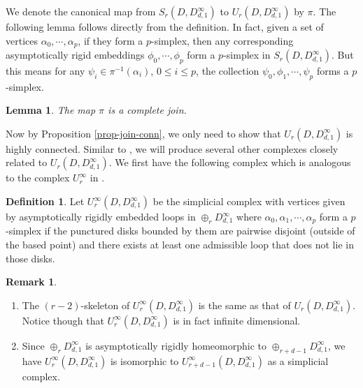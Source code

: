 \documentclass[11pt, a4paper]{amsart}
\newtheorem{lem}[thm]{Lemma}
\theoremstyle{definition}
\newtheorem{rem}[thm]{Remark}
\newtheorem{defn}[thm]{Definition} %
\begin{document}
  

We denote the canonical map from $S_r(D,D^{\infty}_{d,1})$ to $U_r(D,D^{\infty}_{d,1})$ by $\pi$. The following lemma follows directly from the definition. In fact, given a set of vertices $\alpha_0,\cdots, \alpha_p$, if they form a $p$-simplex, then  any corresponding asymptotically rigid embeddings $\phi_0,\cdots,\phi_p$  form a $p$-simplex in $S_r(D,D^{\infty}_{d,1})$. But this means for any $\psi_i \in \pi^{-1}(\alpha_i)$, $0\leq i\leq p$, the collection $\psi_0, \phi_1,\cdots, \psi_p$ forms a $p$-simplex.


\begin{lem}\label{lem-cpt-jn}
The map $\pi$ is a complete join.
\end{lem}




Now by Proposition \ref{prop-join-conn}, we only need to show that $U_r(D,D^{\infty}_{d,1})$ is highly connected.  Similar to \cite[Section 2.4]{SW19}, we will produce several other complexes closely related to $U_r(D,D^{\infty}_{d,1})$. We first have the following complex which is analogous to the complex $U_r^{\infty}$ in \cite[Definition 2.12]{SW19}.
 
\begin{defn}
  Let $U_r^{\infty}(D,D^{\infty}_{d,1})$ be the simplicial complex with vertices given by asymptotically rigidly embedded loops in  $\oplus_r D^{\infty}_{d,1}$ where $\alpha_0,\alpha_1,\cdots,\alpha_p$ form a $p$-simplex if the punctured disks bounded by them are pairwise disjoint (outside of the based point) and there exists  at least one admissible loop that does not lie in those disks.
\end{defn}

\begin{rem} \label{rem-Un}
\begin{enumerate}
    \item The $(r-2)$-skeleton of $U_r^{\infty}(D,D^{\infty}_{d,1})$ is the same as that of $U_r(D,D^{\infty}_{d,1})$. Notice though that $U_r^{\infty}(D,D^{\infty}_{d,1})$ is in fact infinite dimensional.
    
    \item Since $\oplus_rD^{\infty}_{d,1}$ is asymptotically rigidly homeomorphic to $\oplus_{r+d-1}D^{\infty}_{d,1}$, we have $U_r^{\infty}(D,D^{\infty}_{d,1})$ is isomorphic to $U_{r+d-1}^{\infty}(D,D^{\infty}_{d,1})$ as a simplicial complex. 
\end{enumerate}
\end{rem}
\end{document}
